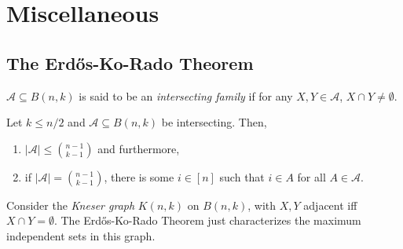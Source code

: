 
\clearpage
\section{Miscellaneous}

\subsection{The Erd\H{o}s-Ko-Rado Theorem}

\begin{fdef}
	$\mathcal{A} \subseteq B(n,k)$ is said to be an \emph{intersecting family} if for any $X,Y \in \mathcal{A}$, $X \cap Y \ne \emptyset$.
\end{fdef}

\begin{ftheo}
	\label{ekr}
	Let $k \le n/2$ and $\mathcal{A} \subseteq B(n,k)$ be intersecting. Then,
	\begin{enumerate}[label=(\alph*)]
		\item $|\mathcal{A}| \le \binom{n-1}{k-1}$ and furthermore,
		\item if $|\mathcal{A}| = \binom{n-1}{k-1}$, there is some $i \in [n]$ such that $i \in A$ for all $A \in \mathcal{A}$.
	\end{enumerate}
\end{ftheo}


Consider the \emph{Kneser graph} $K(n,k)$ on $B(n,k)$, with $X,Y$ adjacent iff $X \cap Y = \emptyset$. The Erd\H{o}s-Ko-Rado Theorem just characterizes the maximum independent sets in this graph.

